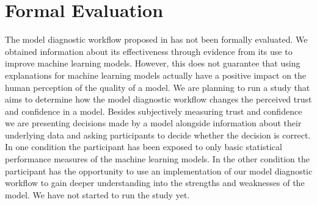 \section{Formal Evaluation}
The model diagnostic workflow proposed in  has not been formally evaluated.
We obtained information about its effectiveness through evidence from its use to improve machine learning models.
However, this does not guarantee that using explanations for machine learning models actually have a positive impact on the human perception of the quality of a model.
We are planning to run a study that aims to determine how the model diagnostic workflow changes the perceived trust and confidence in a model.
Besides subjectively measuring trust and confidence we are presenting decisions made by a model alongside information about their underlying data and asking participants to decide whether the decision is correct.
In one condition the participant has been exposed to only basic statistical performance measures of the machine learning models.
In the other condition the participant has the opportunity to use an implementation of our model diagnostic workflow to gain deeper understanding into the strengths and weaknesses of the model.
We have not started to run the study yet.


% 

